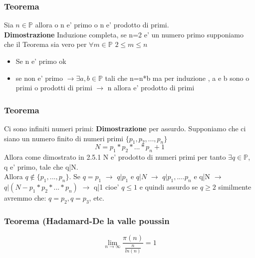\documentclass{article}
\begin{document}
    \subsubsection{Teorema}
    \begin{flushleft}
        Sia $n\in \mathbb{P}$ allora o n e' primo o n e' prodotto di primi. \\
        \textbf{Dimostrazione} Induzione completa, se n=2 e' un numero primo supponiamo che il Teorema
        sia vero per $\forall m \in \mathbb{P}$ $2 \leq m \leq n$
        \begin{itemize}
            \item Se n e' primo ok
            \item se non e' primo $\rightarrow \exists a,b \in \mathbb{P}$ tali che n=n*b
                ma per induzione , a e b sono o primi o prodotti di primi $\rightarrow $ n allora e' prodotto di primi
        \end{itemize}
    \end{flushleft}
    \subsubsection{Teorema}
    \begin{flushleft}
      Ci sono infiniti numeri primi: \textbf{Dimostrazione} per assurdo. Supponiamo che ci siano un numero finito di numeri primi $\{p_1,p_2,...,p_n\}$ 
      \begin{equation}
       N = p_1*p_2*...*p_n+1 
      \end{equation}
      Allora come dimostrato in 2.5.1 N e' prodotto di numeri primi per tanto $\exists q \in \mathbb{P}$, q e' primo, tale che q|N. \\
      Allora $q\notin \{p_1,...,p_n\}$. Se $q=p_1$ $\to$ $q|p_1$ e $q|N$ $\to$ $q|p_1,....p_n$ e q|N $\to$ $q|(N-p_1*p_2*...*p_n)$ $\to$ q|1 cioe' $q\leq1$ e quindi assurdo
      se $q\geq2$ similmente avremmo che: $q=p_2,q=p_3$, etc.
    \end{flushleft}
    \subsubsection{Teorema (Hadamard-De la valle poussin}
    \begin{flushleft}
      \begin{equation}
        \lim_{n \to \infty} \frac{\pi(n)}{\frac{n}{ln(n)}} =1
      \end{equation}
    \end{flushleft}
\end{document}
